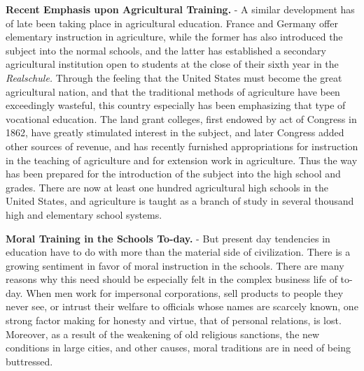 \documentclass[
]{book}
\begin{document}
\textbf{Recent Emphasis upon Agricultural Training.} - A similar development has of late been taking place in agricultural education. France and Germany offer elementary instruction in agriculture, while the former has also introduced the subject into the normal schools, and the latter has established a secondary agricultural institution open to students at the close of their sixth year in the \emph{Realschule.} Through the feeling that the United States must become the great agricultural nation, and that the traditional methods of agriculture have been exceedingly wasteful, this country especially has been emphasizing that type of vocational education. The land grant colleges, first endowed by act of Congress in 1862, have greatly stimulated interest in the subject, and later Congress added other sources of revenue, and has recently furnished appropriations for instruction in the teaching of agriculture and for extension work in agriculture. Thus the way has been prepared for the introduction of the subject into the high school and grades. There are now at least one hundred agricultural high schools in the United States, and agriculture is taught as a branch of study in several thousand high and elementary school systems.

\textbf{Moral Training in the Schools To-day.} - But present day tendencies in education have to do with more than the material side of civilization. There is a growing sentiment in favor of moral instruction in the schools. There are many reasons why this need should be especially felt in the complex business life of to-day. When men work for impersonal corporations, sell products to people they never see, or intrust their welfare to officials whose names are scarcely known, one strong factor making for honesty and virtue, that of personal relations, is lost. Moreover, as a result of the weakening of old religious sanctions, the new conditions in large cities, and other causes, moral traditions are in need of being buttressed.
\end{document}
